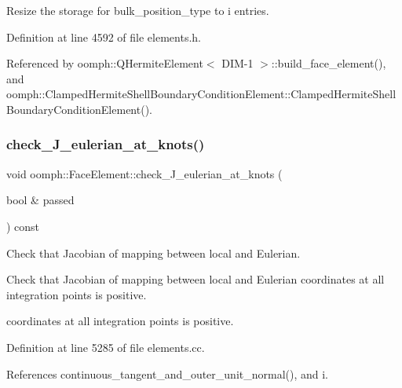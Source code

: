 Resize the storage for bulk\+\_\+position\+\_\+type to i entries. 



Definition at line 4592 of file elements.\+h.



Referenced by oomph\+::\+Q\+Hermite\+Element$<$ D\+I\+M-\/1 $>$\+::build\+\_\+face\+\_\+element(), and oomph\+::\+Clamped\+Hermite\+Shell\+Boundary\+Condition\+Element\+::\+Clamped\+Hermite\+Shell\+Boundary\+Condition\+Element().

\mbox{\label{classoomph_1_1FaceElement_aabfb54314baeb47bb56f8de8e4dfe513}} 
\subsubsection{\texorpdfstring{check\+\_\+\+J\+\_\+eulerian\+\_\+at\+\_\+knots()}{check\_J\_eulerian\_at\_knots()}}
{\footnotesize\ttfamily void oomph\+::\+Face\+Element\+::check\+\_\+\+J\+\_\+eulerian\+\_\+at\+\_\+knots (\begin{DoxyParamCaption}\item[{bool \&}]{passed }\end{DoxyParamCaption}) const}



Check that Jacobian of mapping between local and Eulerian. 

Check that Jacobian of mapping between local and Eulerian coordinates at all integration points is positive.

coordinates at all integration points is positive. 

Definition at line 5285 of file elements.\+cc.



References continuous\+\_\+tangent\+\_\+and\+\_\+outer\+\_\+unit\+\_\+normal(), and i.

\mbox{\label{classoomph_1_1FaceElement_a182997beb4a64fde40a47007344913f1}} 
